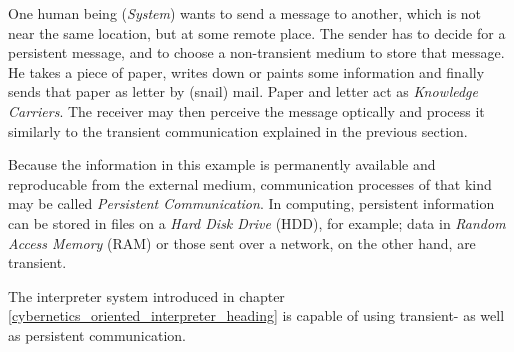 One human being (\emph{System}) wants to send a message to another, which is
not near the same location, but at some remote place. The sender has to decide
for a persistent message, and to choose a non-transient medium to store that
message. He takes a piece of paper, writes down or paints some information and
finally sends that paper as letter by (snail) mail. Paper and letter act as
\emph{Knowledge Carriers}. The receiver may then perceive the message optically
and process it similarly to the transient communication explained in the
previous section.

Because the information in this example is permanently available and
reproducable from the external medium, communication processes of that kind may
be called \emph{Persistent Communication}. In computing, persistent information
can be stored in files on a \emph{Hard Disk Drive} (HDD), for example; data in
\emph{Random Access Memory} (RAM) or those sent over a network, on the other
hand, are transient.

The interpreter system introduced in chapter
\ref{cybernetics_oriented_interpreter_heading} is capable of using transient-
as well as persistent communication.
